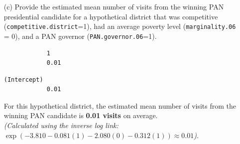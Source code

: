 \documentclass[12pt,letterpaper]{article}
\begin{document}
\begin{enumerate}
		
		
		\begin{verbatim}
			
(Intercept) competitive.district       marginality.06      PAN.governor.06 
						0.022                0.922                0.125                0.732 
		\end{verbatim}
		
		\vspace{0.2cm}
		\textit{(Note: Exponentiating the Poisson coefficients yields Incidence Rate Ratios).}
		\begin{itemize}
			\item \textbf{\texttt{marginality.06}:} For a one-unit increase in the poverty level, the expected number of PAN presidential visits changes by a \textbf{multiplicative factor of 0.125} ($e^{-2.080}$), holding other variables constant. In other words, visits drastically decrease as poverty increases.
			\item \textbf{\texttt{PAN.governor.06}:} The incidence rate ratio for PAN.governor.06 is 0.732, suggesting that districts in states with a PAN-affiliated governor are expected to receive about 26.8\% fewer visits than districts in states without a PAN governor, holding other variables constant. However, this estimate is not statistically significant at the 5\% level (p = 0.0617).
		\end{itemize}
		
		
		\item [(c)]
		Provide the estimated mean number of visits from the winning PAN presidential candidate for a hypothetical district that was competitive (\texttt{competitive.district}=1), had an average poverty level (\texttt{marginality.06} = 0), and a PAN governor (\texttt{PAN.governor.06}=1).
		
		
		
		\begin{verbatim}
			1 
			0.01
		\end{verbatim}
		
		
		
		\begin{verbatim}
(Intercept) 
			0.01 
		\end{verbatim}
		
		\vspace{0.2cm}
		For this hypothetical district, the estimated mean number of visits from the winning PAN candidate is \textbf{0.01 visits} on average. \\
		\textit{(Calculated using the inverse log link: $\exp(-3.810 - 0.081(1) - 2.080(0) - 0.312(1)) \approx 0.01$)}.
		
	\end{enumerate}
	
\end{document}
